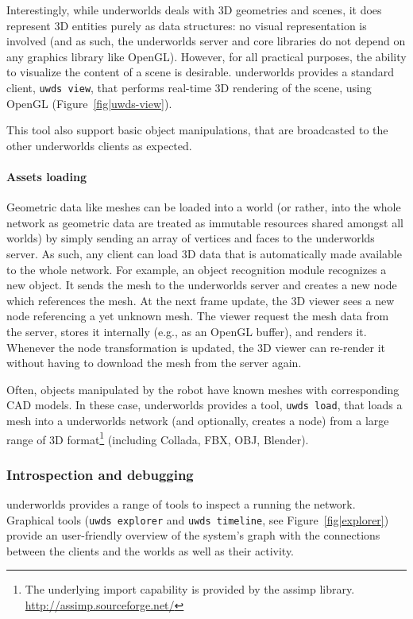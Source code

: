 \documentclass[letterpaper, 10 pt, conference]{ieeeconf}  %
\newcommand{\eg}{e.g.,\xspace}
\newcommand{\uwds}{{\sc underworlds}\xspace}
\begin{document}
Interestingly, while \uwds deals with 3D geometries and scenes, it does
represent 3D entities purely as data structures: no visual representation is
involved (and as such, the \uwds server and core libraries do not depend on any
graphics library like OpenGL). However, for all practical purposes, the ability
to visualize the content of a scene is desirable. \uwds provides a standard
client, {\tt uwds view}, that performs real-time 3D rendering of the scene,
using OpenGL (Figure~\ref{fig|uwds-view}).

This tool also support basic object manipulations, that are broadcasted to the
other \uwds clients as expected.

\paragraph*{Assets loading}

Geometric data like meshes can be loaded into a world (or rather, into the whole
network as geometric data are treated as immutable resources shared amongst all
worlds) by simply sending an array of vertices and faces to the \uwds server.
As such, any client can load 3D data that is automatically made available to the
whole network. For example, an object recognition module recognizes a new
object. It sends the mesh to the \uwds server and creates a new node which
references the mesh. At the next frame update, the 3D viewer sees a new node
referencing a yet unknown mesh. The viewer request the mesh data from the
server, stores it internally (\eg as an OpenGL buffer), and renders it. Whenever
the node transformation is updated, the 3D viewer can re-render it without
having to download the mesh from the server again.

Often, objects manipulated by the robot have known meshes with corresponding CAD
models. In these case, \uwds provides a tool, {\tt uwds load}, that loads a mesh
into a \uwds network (and optionally, creates a node) from a large range of 3D
format\footnote{The underlying import capability is provided by the {\sc assimp}
library.  \url{http://assimp.sourceforge.net/}} (including Collada, FBX, OBJ,
Blender).

\subsubsection{Introspection and debugging}

\uwds provides a range of tools to inspect a running the network. Graphical
tools ({\tt uwds explorer} and {\tt uwds timeline}, see Figure~\ref{fig|explorer})
provide an user-friendly overview of the system's graph with the connections
between the clients and the worlds as well as their activity.
\end{document}
